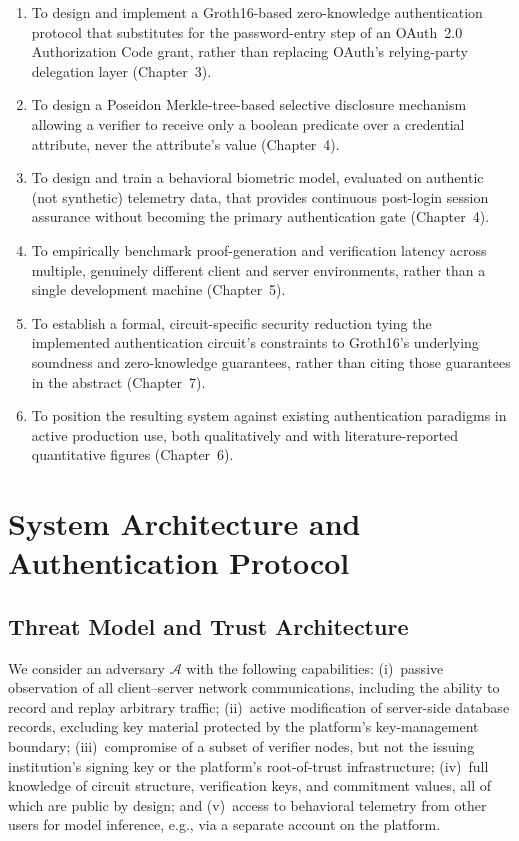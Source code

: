 \documentclass[12pt,a4paper,oneside]{report}
\begin{document}
\begin{enumerate}
  \item To design and implement a Groth16-based zero-knowledge
        authentication protocol that substitutes for the password-entry
        step of an OAuth~2.0 Authorization Code grant, rather than
        replacing OAuth's relying-party delegation layer (Chapter~3).
  \item To design a Poseidon Merkle-tree-based selective disclosure
        mechanism allowing a verifier to receive only a boolean
        predicate over a credential attribute, never the attribute's
        value (Chapter~4).
  \item To design and train a behavioral biometric model, evaluated on
        authentic (not synthetic) telemetry data, that provides
        continuous post-login session assurance without becoming the
        primary authentication gate (Chapter~4).
  \item To empirically benchmark proof-generation and verification
        latency across multiple, genuinely different client and server
        environments, rather than a single development machine
        (Chapter~5).
  \item To establish a formal, circuit-specific security reduction
        tying the implemented authentication circuit's constraints to
        Groth16's underlying soundness and zero-knowledge guarantees,
        rather than citing those guarantees in the abstract
        (Chapter~7).
  \item To position the resulting system against existing
        authentication paradigms in active production use, both
        qualitatively and with literature-reported quantitative figures
        (Chapter~6).
\end{enumerate}

\chapter{System Architecture and Authentication Protocol}

\section{Threat Model and Trust Architecture}

We consider an adversary $\mathcal{A}$ with the following capabilities:
(i)~passive observation of all client--server network communications,
including the ability to record and replay arbitrary traffic;
(ii)~active modification of server-side database records, excluding key
material protected by the platform's key-management boundary;
(iii)~compromise of a subset of verifier nodes, but not the issuing
institution's signing key or the platform's root-of-trust infrastructure;
(iv)~full knowledge of circuit structure, verification keys, and
commitment values, all of which are public by design; and
(v)~access to behavioral telemetry from other users for model inference,
e.g., via a separate account on the platform.
\end{document}
